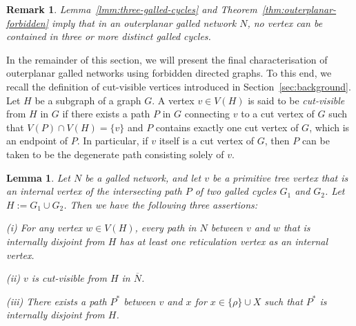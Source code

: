 \documentclass[pdflatex,sn-mathphys-num]{sn-jnl}
\theoremstyle{thmstyleone}%
\theoremstyle{thmstyletwo}%
\newtheorem{remark}{Remark}%
\newtheorem{lemma}{Lemma}
\theoremstyle{thmstylethree}%
\begin{document}
\begin{remark}
Lemma~\ref{lmm:three-galled-cycles} and Theorem~\ref{thm:outerplanar-forbidden} imply that in an outerplanar galled network $N$, no vertex can be contained in three or more distinct galled cycles.
\end{remark}



In the remainder of this section, we will present the final characterisation of outerplanar galled networks using forbidden directed graphs. To this end, we recall the definition of cut-visible vertices introduced in Section~\ref{sec:background}.
Let $H$ be a subgraph of a graph $G$. A vertex $v \in V(H)$ is said to be \emph{cut-visible} from $H$ in $G$ if there exists a path $P$ in $G$ connecting $v$ to a cut vertex of $G$ such that $V(P) \cap V(H) = \{v\}$ and $P$ contains exactly one cut vertex of $G$, which is an endpoint of $P$. In particular, if $v$ itself is a cut vertex of $G$, then $P$ can be taken to be the degenerate path consisting solely of $v$.


\begin{lemma}\label{lmm:overlap-path-property}
Let $N$ be a galled network, and let $v$ be a primitive tree vertex that is an internal vertex of the intersecting path $P$ of two galled cycles $G_1$ and $G_2$. Let $H := G_1 \cup G_2$. Then we have the following three assertions:

(i) For any vertex $w \in V(H)$, every path in $N$ between $v$ and $w$ that is internally disjoint from $H$ has at least one reticulation vertex as an internal vertex.

(ii) $v$ is cut-visible from $H$ in $\overline{N}$.

(iii) There exists a path $P^*$ between $v$ and $x$ for $x\in \{\rho\}\cup X$ such that $P^*$ is internally disjoint from $H$.

\end{lemma}
\end{document}
